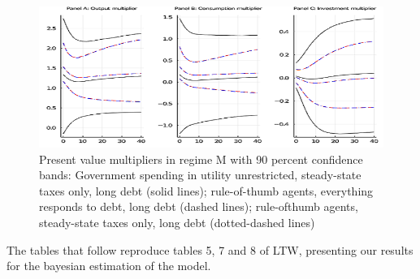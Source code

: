 \documentclass[letterpaper,12pt]{article}%
\begin{document}
\begin{figure}[H]
    \centering
    \includegraphics[width=12cm]{figure2.png}
    \caption{Present value multipliers in regime M with 90 percent confidence bands: Government spending in utility unrestricted, steady-state taxes
only, long debt (solid lines); rule-of-thumb agents, everything responds to debt, long debt (dashed lines); rule-ofthumb
agents, steady-state taxes only, long debt (dotted-dashed lines) }
    \label{fig:my_label}
\end{figure}

The tables that follow reproduce tables 5, 7 and 8 of LTW, presenting our results for the bayesian estimation of the model.
\end{document}
